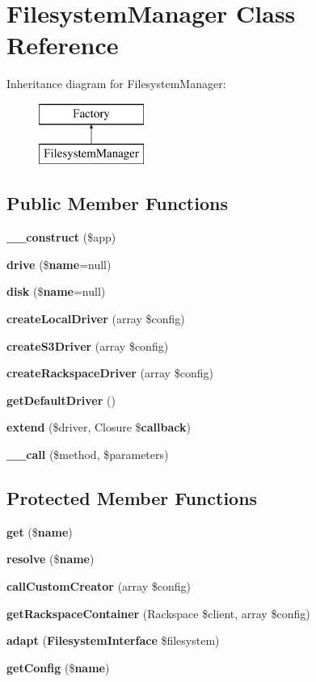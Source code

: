\section{Filesystem\+Manager Class Reference}
\label{class_illuminate_1_1_filesystem_1_1_filesystem_manager}
Inheritance diagram for Filesystem\+Manager\+:\begin{figure}[H]
\begin{center}
\leavevmode
\includegraphics[height=2.000000cm]{class_illuminate_1_1_filesystem_1_1_filesystem_manager}
\end{center}
\end{figure}
\subsection*{Public Member Functions}
\begin{DoxyCompactItemize}
\item 
{\bf \+\_\+\+\_\+construct} (\$app)
\item 
{\bf drive} (\${\bf name}=null)
\item 
{\bf disk} (\${\bf name}=null)
\item 
{\bf create\+Local\+Driver} (array \$config)
\item 
{\bf create\+S3\+Driver} (array \$config)
\item 
{\bf create\+Rackspace\+Driver} (array \$config)
\item 
{\bf get\+Default\+Driver} ()
\item 
{\bf extend} (\$driver, Closure \${\bf callback})
\item 
{\bf \+\_\+\+\_\+call} (\$method, \$parameters)
\end{DoxyCompactItemize}
\subsection*{Protected Member Functions}
\begin{DoxyCompactItemize}
\item 
{\bf get} (\${\bf name})
\item 
{\bf resolve} (\${\bf name})
\item 
{\bf call\+Custom\+Creator} (array \$config)
\item 
{\bf get\+Rackspace\+Container} (Rackspace \$client, array \$config)
\item 
{\bf adapt} ({\bf Filesystem\+Interface} \$filesystem)
\item 
{\bf get\+Config} (\${\bf name})
\end{DoxyCompactItemize}
